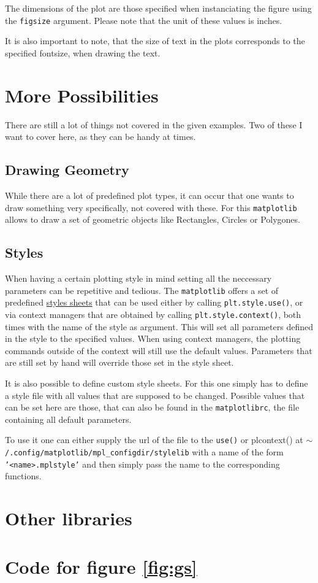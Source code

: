 \documentclass[a4paper, 11pt, twocolumn]{article}
\newcommand{\mpl}{\texttt{matplotlib}\xspace}
\newcommand{\pl}[1]{\mbox{\texttt{#1}\xspace}}
\begin{document}
The dimensions of the plot are those specified when instanciating the figure
using the \pl{figsize} argument. Please note that the unit of these values is
inches. 

It is also important to note, that the size of text in the plots corresponds
to the specified fontsize, when drawing the text.


\section{More Possibilities}

There are still a lot of things not covered in the given examples. Two of these
I want to cover here, as they can be handy at times.

\subsection{Drawing Geometry}

While there are a lot of predefined plot types, it can occur that one wants to
draw something very specifically, not covered with these. For this \mpl allows
to draw a set of geometric objects like Rectangles, Circles or Polygones.


\subsection{Styles}

When having a certain plotting style in mind setting all the neccessary
parameters can be repetitive and tedious. The \mpl offers a set of predefined
\href{https://matplotlib.org/users/style\_sheets.html}{styles sheets} that can
be used either by calling \pl{plt.style.use()}, or via context managers that
are obtained by calling \pl{plt.style.context()}, both times with the name of
the style as argument. This will set all parameters defined in the style to the
specified values. When using context managers, the plotting commands outside of
the context will still use the default values.  Parameters that are still set
by hand will override those set in the style sheet.

It is also possible to define custom style sheets. For this one simply has to
define a style file with all values that are supposed to be changed. Possible
values that can be set here are those, that can also be found in the 
\pl{matplotlibrc}, the file containing all default parameters.

To use it one can either supply the url of the file to the \pl{use()} or
pl{context()} at \pl{$\sim$/.config/matplotlib/mpl\_configdir/stylelib} with a
name of the form \pl{'<name>.mplstyle'} and then simply pass the name to the
corresponding functions.


\section{Other libraries}

\onecolumn

\section{Code for figure \ref{fig:gs}}
\label{sec:gs}

\inputminted[linenos, mathescape]{python}{grid_spec.py}
\end{document}
